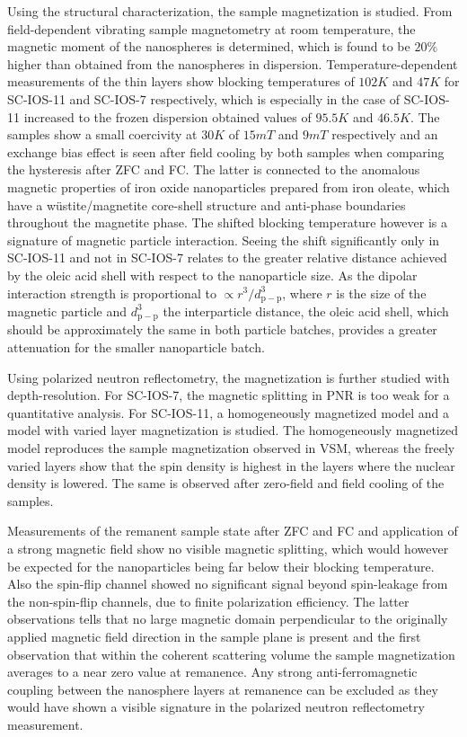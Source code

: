 \documentclass[\main/dresen_thesis.tex]{subfiles}
\begin{document}
  Using the structural characterization, the sample magnetization is studied.
  From field-dependent vibrating sample magnetometry at room temperature, the magnetic moment of the nanospheres is determined, which is found to be $20 \%$ higher than obtained from the nanospheres in dispersion.
  Temperature-dependent measurements of the thin layers show blocking temperatures of $102 \unit{K}$ and $47 \unit{K}$ for SC-IOS-11 and SC-IOS-7 respectively, which is especially in the case of SC-IOS-11 increased to the frozen dispersion obtained values of $95.5 \unit{K}$ and $46.5 \unit{K}$.
  The samples show a small coercivity at $30 \unit{K}$ of $15 \unit{mT}$ and $9 \unit{mT}$ respectively and an exchange bias effect is seen after field cooling by both samples when comparing the hysteresis after ZFC and FC.
  The latter is connected to the anomalous magnetic properties of iron oxide nanoparticles prepared from iron oleate, which have a w\"ustite/magnetite core-shell structure and anti-phase boundaries throughout the magnetite phase.
  The shifted blocking temperature however is a signature of magnetic particle interaction.
  Seeing the shift significantly only in SC-IOS-11 and not in SC-IOS-7 relates to the greater relative distance achieved by the oleic acid shell with respect to the nanoparticle size.
  As the dipolar interaction strength is proportional to $\propto r^3 / d_\mathrm{p-p}^3$, where $r$ is the size of the magnetic particle and $d_\mathrm{p-p}^3$ the interparticle distance, the oleic acid shell, which should be approximately the same in both particle batches, provides a greater attenuation for the smaller nanoparticle batch.

  Using polarized neutron reflectometry, the magnetization is further studied with depth-resolution.
  For SC-IOS-7, the magnetic splitting in PNR is too weak for a quantitative analysis.
  For SC-IOS-11, a homogeneously magnetized model and a model with varied layer magnetization is studied.
  The homogeneously magnetized model reproduces the sample magnetization observed in VSM, whereas the freely varied layers show that the spin density is highest in the layers where the nuclear density is lowered.
  The same is observed after zero-field and field cooling of the samples.

  Measurements of the remanent sample state after ZFC and FC and application of a strong magnetic field show no visible magnetic splitting, which would however be expected for the nanoparticles being far below their blocking temperature.
  Also the spin-flip channel showed no significant signal beyond spin-leakage from the non-spin-flip channels, due to finite polarization efficiency.
  The latter observations tells that no large magnetic domain perpendicular to the originally applied magnetic field direction in the sample plane is present and the first observation that within the coherent scattering volume the sample magnetization averages to a near zero value at remanence.
  Any strong anti-ferromagnetic coupling between the nanosphere layers at remanence can be excluded as they would have shown a visible signature in the polarized neutron reflectometry measurement.
\end{document}
